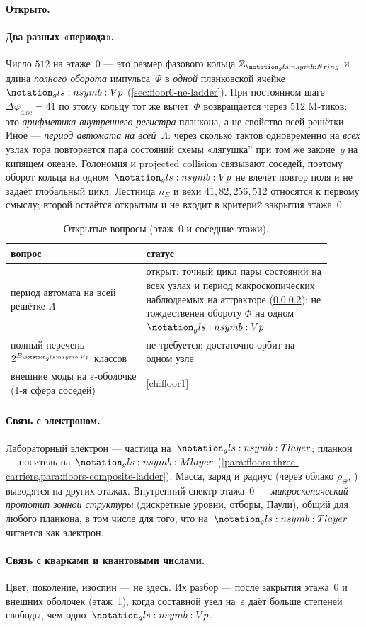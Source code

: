 \paragraph{Открыто.}

\paragraph{Два разных «периода».}
\label{para:floor0-two-periods}
Число $512$ на этаже~0 --- это размер фазового кольца $\mathbb{Z}_{\phaseRingCount}$
и длина \emph{полного оборота} импульса~$\Phi$ в \emph{одной} планковской ячейке~$\hv$
(\cref{sec:floor0-ne-ladder}).
При постоянном шаге $\Delta\varphi_{\mathrm{disc}}=41$ по этому кольцу тот же вычет~$\Phi$
возвращается через $512$ M-тиков: это \emph{арифметика внутреннего регистра} планкона,
а не свойство всей решётки.
Иное --- \emph{период автомата на всей}~$\Lambda$:
через сколько тактов одновременно на \emph{всех} узлах тора повторяется пара состояний
схемы «лягушка'' при том же законе~$g$ на кипящем океане.
Голономия и projected collision связывают соседей, поэтому оборот кольца на одном~$\hv$
не влечёт повтор поля и не задаёт глобальный цикл.
Лестница $n_E$ и вехи $41,82,256,512$ относятся к первому смыслу;
второй остаётся открытым и не входит в критерий закрытия этажа~0.

\begin{table}[htbp]
  \centering
  \caption{Открытые вопросы (этаж~0 и соседние этажи).}
  \label{tab:floor0-open}
  \begin{tabular}{@{}p{0.38\linewidth}p{0.52\linewidth}@{}}
    \toprule
    вопрос & статус \\
    \midrule
    период автомата на всей решётке $\Lambda$ &
    открыт: точный цикл пары состояний на всех узлах и период макроскопических наблюдаемых
    на аттракторе (\cref{para:floor0-two-periods}); не тождественен обороту $\Phi$ на одном~$\hv$ \\
    полный перечень $2^{B_{\hv}}$ классов &
    не требуется; достаточно орбит на одном узле \\
    внешние моды на $\varepsilon$-оболочке (1-я сфера соседей) &
    \cref{ch:floor1} \\
    \bottomrule
  \end{tabular}
\end{table}

\paragraph{Связь с электроном.}
Лабораторный электрон --- частица на~$\layerMacro$; планкон --- носитель на~$\layerMicro$
(\cref{para:floors-three-carriers,para:floors-composite-ladder}).
Масса, заряд и радиус (через облако $\rho_\Theta$, ) выводятся на других этажах.
Внутренний спектр этажа~0 --- \emph{микроскопический прототип зонной структуры}
(дискретные уровни, отборы, Паули), общий для любого планкона,
в том числе для того, что на~$\layerMacro$ читается как электрон.

\paragraph{Связь с кварками и квантовыми числами.}
Цвет, поколение, изоспин --- не здесь.
Их разбор --- после закрытия этажа~0 и внешних оболочек (этаж~1),
когда составной узел на~$\varepsilon$ даёт больше степеней свободы, чем одно~$\hv$.
